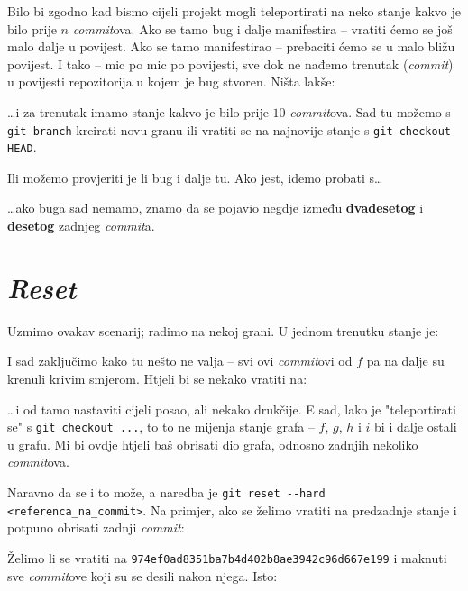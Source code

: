 Bilo bi zgodno kad bismo cijeli projekt mogli teleportirati na neko stanje kakvo je bilo prije $n$ \emph{commit}ova.
Ako se tamo bug i dalje manifestira -- vratiti ćemo se još malo dalje u povijest.
Ako se tamo manifestirao -- prebaciti ćemo se u malo bližu povijest.
I tako -- mic po mic po povijesti, sve dok ne nađemo trenutak (\emph{commit}) u povijesti repozitorija u kojem je bug stvoren.
Ništa lakše:


\dots{}i za trenutak imamo stanje kakvo je bilo prije $10$ \emph{commit}ova. Sad tu možemo s \verb+git branch+ kreirati novu granu ili vratiti se na najnovije stanje s \verb+git checkout HEAD+.

Ili možemo provjeriti je li bug i dalje tu. Ako jest, idemo probati s\dots


\dots{}ako buga sad nemamo, znamo da se pojavio negdje između \textbf{dvadesetog} i \textbf{desetog} zadnjeg \emph{commit}a.

\section*{\emph{Reset}}

Uzmimo ovakav scenarij; radimo na nekoj grani.
U jednom trenutku stanje je:



I sad zaključimo kako tu nešto ne valja -- svi ovi \emph{commit}ovi od $f$ pa na dalje su krenuli krivim smjerom.
Htjeli bi se nekako vratiti na:



\dots{}i od tamo nastaviti cijeli posao, ali nekako drukčije.
E sad, lako je "teleportirati se" s \verb+git checkout ...+, to to ne mijenja stanje grafa -- $f$, $g$, $h$ i $i$ bi i dalje ostali u grafu.
Mi bi ovdje htjeli baš obrisati dio grafa, odnosno zadnjih nekoliko \emph{commit}ova.

Naravno da se i to može, a naredba je \verb+git reset --hard <referenca_na_commit>+.
Na primjer, ako se želimo vratiti na predzadnje stanje i potpuno obrisati zadnji \emph{commit}:


Želimo li se vratiti na \verb+974ef0ad8351ba7b4d402b8ae3942c96d667e199+ i maknuti sve \emph{commit}ove koji su se desili nakon njega.
Isto:

